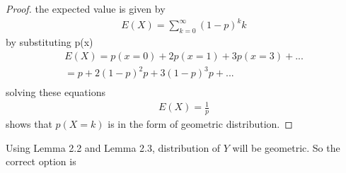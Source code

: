 \documentclass[journal,12pt,twocolumn]{IEEEtran}
\begin{document}
\begin{proof}
the expected value is given by
\begin{align}
E(X) = \sum_{k=0}^{\infty}(1-p)^{k}k
\end{align}
by substituting p(x)
\begin{align}
E(X) = p(x=0)+2p(x=1)+3p(x=3)+...\\
=p+2(1-p)^{2}p+3(1-p)^{3}p+...\nonumber\\
\end{align}
solving these equations
\begin{align}
E(X)=\frac{1}{p}
\end{align}
shows that $p(X=k)$ is in the form of geometric distribution.
\end{proof}
Using Lemma 2.2 and Lemma 2.3, distribution of $Y$ will be geometric.
So the correct option is 
\end{document}
